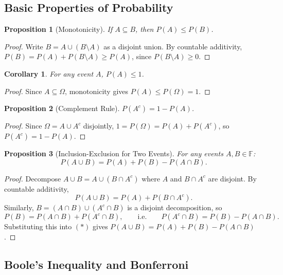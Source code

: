 \documentclass{article}
\newtheorem{corollary}{Corollary}[theorem]
\newtheorem{proposition}{Proposition}
\begin{document}
\subsection{Basic Properties of Probability}

\begin{proposition}[Monotonicity]
If $A \subseteq B$, then $P(A) \leq P(B)$.
\end{proposition}

\begin{proof}
Write $B = A \cup (B \setminus A)$ as a disjoint union. By countable additivity, $P(B) = P(A) + P(B \setminus A) \geq P(A)$, since $P(B \setminus A) \geq 0$.
\end{proof}

\begin{corollary}
For any event $A$, $P(A) \leq 1$.
\end{corollary}

\begin{proof}
Since $A \subseteq \Omega$, monotonicity gives $P(A) \leq P(\Omega) = 1$.
\end{proof}

\begin{proposition}[Complement Rule]
$P(A^c) = 1 - P(A)$.
\end{proposition}

\begin{proof}
Since $\Omega = A \cup A^c$ disjointly, $1 = P(\Omega) = P(A) + P(A^c)$, so $P(A^c) = 1 - P(A)$.
\end{proof}

\begin{proposition}[Inclusion-Exclusion for Two Events]
For any events $A, B \in \mathbb{F}$:
\[
P(A \cup B) = P(A) + P(B) - P(A \cap B).
\]
\end{proposition}

\begin{proof}
Decompose $A \cup B = A \cup (B \cap A^c)$ where $A$ and $B \cap A^c$ are disjoint. By countable additivity,
\[
P(A \cup B) = P(A) + P(B \cap A^c). \tag{$*$}
\]
Similarly, $B = (A \cap B) \cup (A^c \cap B)$ is a disjoint decomposition, so
\[
P(B) = P(A \cap B) + P(A^c \cap B), \qquad \text{i.e.}\qquad P(A^c \cap B) = P(B) - P(A \cap B).
\]
Substituting this into $(*)$ gives $P(A \cup B) = P(A) + P(B) - P(A \cap B)$.
\end{proof}

\subsection{Boole's Inequality and Bonferroni}
\end{document}
